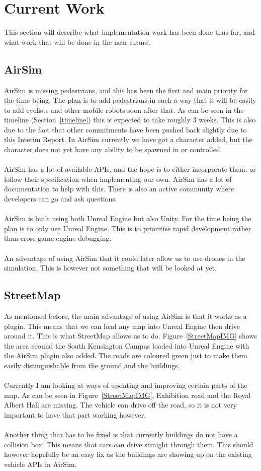\section{Current Work}
This section will describe what implementation work has been done thus far, and what work that will be done in the near future.
\subsection{AirSim}
AirSim is missing pedestrians, and this has been the first and main priority for the time being. The plan is to add pedestrians in such a way that it will be easily to add cyclists and other mobile robots soon after that. As can be seen in the timeline (Section~\ref{timeline}) this is expected to take roughly 3 weeks. This is also due to the fact that other commitments have been pushed back slightly due to this Interim Report. In AirSim currently we have got a character added, but the character does not yet have any ability to be spawned in or controlled.
\\~\\
AirSim has a lot of available APIs, and the hope is to either incorporate them, or follow their specification when implementing our own. AirSim has a lot of documentation to help with this. There is also an active community where developers can go and ask questions. 
\\~\\
AirSim is built using both Unreal Engine but also Unity. For the time being the plan is to only use Unreal Engine. This is to prioritise rapid development rather than cross game engine debugging. 
\\~\\
An advantage of using AirSim that it could later allow us to use drones in the simulation. This is however not something that will be looked at yet. 

\subsection{StreetMap}
As mentioned before, the main advantage of using AirSim is that it works as a plugin. This means that we can load any map into Unreal Engine then drive around it. This is what StreetMap allows us to do. Figure~\ref{StreetMapIMG} shows the area around the South Kensington Campus loaded into Unreal Engine with the AirSim plugin also added. The roads are coloured green just to make them easily distinguishable from the ground and the buildings. 
\\~\\
Currently I am looking at ways of updating and improving certain parts of the map. As can be seen in Figure~\ref{StreetMapIMG}, Exhibition road and the Royal Albert Hall are missing. The vehicle can drive off the road, so it is not very important to have that part working however.
\\~\\
Another thing that has to be fixed is that currently buildings do not have a collision box. This means that cars can drive straight through them. This should however hopefully be an easy fix as the buildings are showing up on the existing vehicle APIs in AirSim.  

